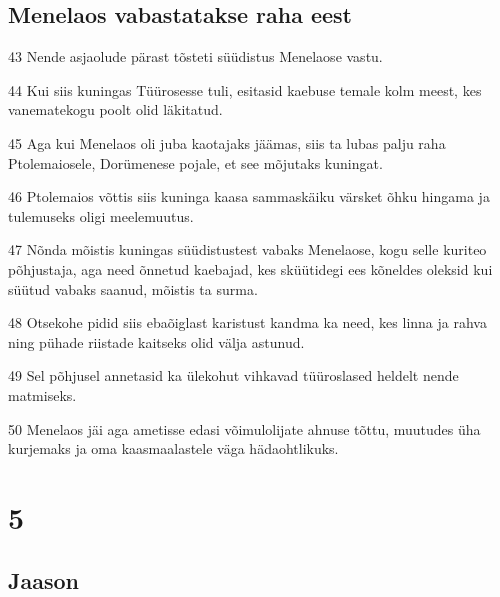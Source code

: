\section*{Menelaos vabastatakse raha eest}

\par 43 Nende asjaolude pärast tõsteti süüdistus Menelaose vastu.
\par 44 Kui siis kuningas Tüürosesse tuli, esitasid kaebuse temale kolm meest, kes vanematekogu poolt olid läkitatud.
\par 45 Aga kui Menelaos oli juba kaotajaks jäämas, siis ta lubas palju raha Ptolemaiosele, Dorümenese pojale, et see mõjutaks kuningat.
\par 46 Ptolemaios võttis siis kuninga kaasa sammaskäiku värsket õhku hingama ja tulemuseks oligi meelemuutus.
\par 47 Nõnda mõistis kuningas süüdistustest vabaks Menelaose, kogu selle kuriteo põhjustaja, aga need õnnetud kaebajad, kes sküütidegi ees kõneldes oleksid kui süütud vabaks saanud, mõistis ta surma.
\par 48 Otsekohe pidid siis ebaõiglast karistust kandma ka need, kes linna ja rahva ning pühade riistade kaitseks olid välja astunud.
\par 49 Sel põhjusel annetasid ka ülekohut vihkavad tüüroslased heldelt nende matmiseks.
\par 50 Menelaos jäi aga ametisse edasi võimulolijate ahnuse tõttu, muutudes üha kurjemaks ja oma kaasmaalastele väga hädaohtlikuks.



\chapter{5}


\section*{Jaason}

